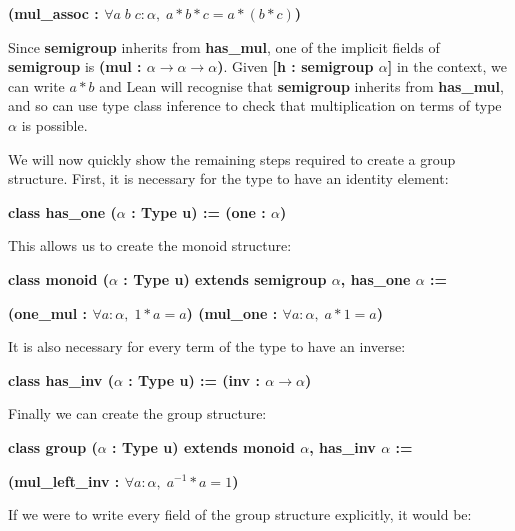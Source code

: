 \documentclass[runningheads,a4paper]{llncs}
\renewcommand{\a}{\alpha}
\renewcommand{\-}{\setminus}
\begin{document}
\hspace{4 em}\textbf{(mul\_assoc : $\forall a\; b\; c : \a,\; a * b * c = a * (b * c)$)}
\vspace{2 mm}

Since \textbf{semigroup} inherits from \textbf{has\_mul}, one of the implicit fields of \textbf{semigroup} is \textbf{(mul : $\a \to \a \to \a$)}. Given \textbf{[h : semigroup $\a$]} in the context, we can write $a * b$ and Lean will recognise that \textbf{semigroup} inherits from \textbf{has\_mul}, and so can use type class inference to check that multiplication on terms of type $\a$ is possible.

We will now quickly show the remaining steps required to create a group structure. First, it is necessary for the type to have an identity element:

\vspace{2 mm}
\hspace{2 em}\textbf{class has\_one ($\a$ : Type u) := (one : $\a$)}
\vspace{2 mm}

This allows us to create the monoid structure:

\vspace{2 mm}
\hspace{2 em}\textbf{class monoid ($\a$ : Type u) extends semigroup $\a$, has\_one $\a$ := }

\hspace{4 em}\textbf{(one\_mul : $\forall a : \a,\; 1 * a = a$) (mul\_one : $\forall a : \a,\; a * 1 = a$)}
\vspace{2 mm}

It is also necessary for every term of the type to have an inverse:

\vspace{2 mm}
\hspace{2 em}\textbf{class has\_inv ($\a$ : Type u) := (inv : $\a \to \a$)}
\vspace{2 mm}

Finally we can create the group structure:

\vspace{2 mm}
\hspace{2 em}\textbf{class group ($\a$ : Type u) extends monoid $\a$, has\_inv $\a$ := }

\hspace{4 em}\textbf{(mul\_left\_inv : $\forall a : \a,\; a^{-1} * a = 1$)}
\vspace{2 mm}

If we were to write every field of the group structure explicitly, it would be:
\end{document}
